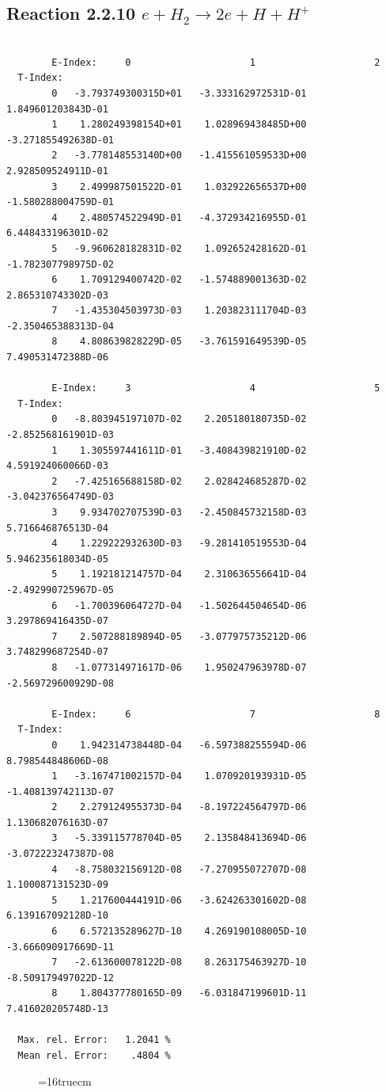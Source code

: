 \documentclass[12pt,dvips]{article}
\begin{document}
\subsection{
Reaction 2.2.10  $ e + H_2  \rightarrow 2e + H + H^+  $ }

\begin{small}\begin{verbatim}

        E-Index:     0                     1                     2
  T-Index:
        0   -3.793749300315D+01   -3.333162972531D-01    1.849601203843D-01
        1    1.280249398154D+01    1.028969438485D+00   -3.271855492638D-01
        2   -3.778148553140D+00   -1.415561059533D+00    2.928509524911D-01
        3    2.499987501522D-01    1.032922656537D+00   -1.580288004759D-01
        4    2.480574522949D-01   -4.372934216955D-01    6.448433196301D-02
        5   -9.960628182831D-02    1.092652428162D-01   -1.782307798975D-02
        6    1.709129400742D-02   -1.574889001363D-02    2.865310743302D-03
        7   -1.435304503973D-03    1.203823111704D-03   -2.350465388313D-04
        8    4.808639828229D-05   -3.761591649539D-05    7.490531472388D-06

        E-Index:     3                     4                     5
  T-Index:
        0   -8.803945197107D-02    2.205180180735D-02   -2.852568161901D-03
        1    1.305597441611D-01   -3.408439821910D-02    4.591924060066D-03
        2   -7.425165688158D-02    2.028424685287D-02   -3.042376564749D-03
        3    9.934702707539D-03   -2.450845732158D-03    5.716646876513D-04
        4    1.229222932630D-03   -9.281410519553D-04    5.946235618034D-05
        5    1.192181214757D-04    2.310636556641D-04   -2.492990725967D-05
        6   -1.700396064727D-04   -1.502644504654D-06    3.297869416435D-07
        7    2.507288189894D-05   -3.077975735212D-06    3.748299687254D-07
        8   -1.077314971617D-06    1.950247963978D-07   -2.569729600929D-08

        E-Index:     6                     7                     8
  T-Index:
        0    1.942314738448D-04   -6.597388255594D-06    8.798544848606D-08
        1   -3.167471002157D-04    1.070920193931D-05   -1.408139742113D-07
        2    2.279124955373D-04   -8.197224564797D-06    1.130682076163D-07
        3   -5.339115778704D-05    2.135848413694D-06   -3.072223247387D-08
        4   -8.758032156912D-08   -7.270955072707D-08    1.100087131523D-09
        5    1.217600444191D-06   -3.624263301602D-08    6.139167092128D-10
        6    6.572135289627D-10    4.269190108005D-10   -3.666090917669D-11
        7   -2.613600078122D-08    8.263175463927D-10   -8.509179497022D-12
        8    1.804377780165D-09   -6.031847199601D-11    7.416020205748D-13

  Max. rel. Error:   1.2041 %
  Mean rel. Error:    .4804 %
\end{verbatim}\end{small}
\begin{figure} \label{2.2.10}
\epsfxsize=16truecm
\end{figure}
\newpage
\end{document}
